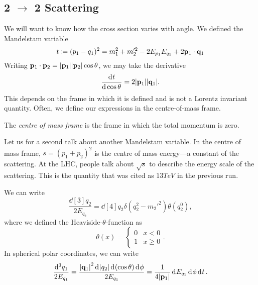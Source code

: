 
\subsection{2 \texorpdfstring{$\to$}{to} 2 Scattering}%
\label{sub:2_$to$_to_2_scattering}

We will want to know how the cross section varies with angle. We defined the Mandelstam variable 
\begin{equation}
  t \coloneqq (p_1 - q_1)^2 = m_1^2 + m_2'^2 - 2 E_{p_1} E_{q_1} + 2 \vb{p}_1 \cdot \vb{q}_1
\end{equation}
Writing $\vb{p}_1 \cdot \vb{p}_2 = \abs{\vb{p}_1} \abs{\vb{p}_2} \cos\theta$, we may take the derivative
\begin{equation}
  \dv[]{t}{\cos\theta}= 2 \abs{\vb{p}_1} \abs{\vb{q}_1}.
\end{equation}
This depends on the frame in which it is defined and is not a Lorentz invariant quantity.
Often, we define our expressions in the centre-of-mass frame.
\begin{definition}[]
  The \emph{centre of mass frame} is the frame in which the total momentum is zero.
\end{definition}

Let us for a second talk about another Mandelstam variable. In the centre of mass frame, $s = (p_1 + p_2)^2$ is the centre of mass energy---a constant of the scattering.
At the LHC, people talk about $\sqrt{s}$ to describe the energy scale of the scattering. This is the quantity that was cited as $13 TeV$ in the previous run.

We can write
\begin{equation}
  \frac{\dd[3]{q_2}}{2 E_{q_2}} = \dd[4]{q_2} \delta(q_2^2 -  m_2'^2) \theta(q_2^0),
\end{equation}
where we defined the Heaviside-$\theta$-function as
\begin{equation}
  \theta(x) = 
  \begin{cases}
    0 & x < 0 \\
    1 & x \geq 0
  \end{cases}.
\end{equation}
In spherical polar coordinates, we can write
\begin{equation}
  \frac{\dd[3]{q_1}}{2 E_{q_1}} = \frac{\abs{\vb{q}_1}^2 \dd[]{\abs{ q_2}} \dd[]{(\cos \theta)} \dd[]{\phi}}{2 E_{q_1}} = \frac{1}{4 \abs{\vb{p}_1}} \dd[]{E_{q_1}} \dd[]{\phi} \dd[]{t}.
\end{equation}

